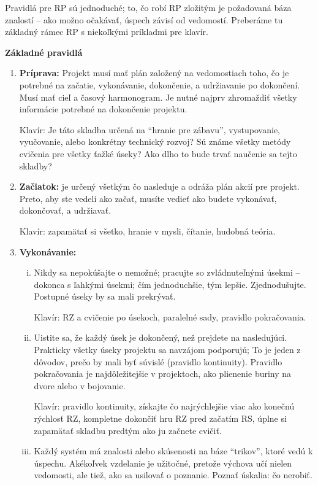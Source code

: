 \documentclass[11pt,a4paper]{book}
\begin{document}
Pravidlá pre RP sú jednoduché; to, čo robí RP zložitým je požadovaná báza znalostí – ako možno očakávať, úspech závisí od vedomostí. Preberáme tu základný rámec RP s niekoľkými príkladmi pre klavír.

\medskip
\noindent\textbf{Základné pravidlá}
\begin{enumerate}[(1)]
\item \textbf{Príprava:} Projekt musí mať plán založený na vedomostiach toho, čo je potrebné na začatie, vykonávanie, dokončenie, a udržiavanie po dokončení. Musí mať cieľ a časový harmonogram. Je nutné najprv zhromaždiť všetky informácie potrebné na dokončenie projektu.

Klavír: Je táto skladba určená na “hranie pre zábavu”, vystupovanie, vyučovanie, alebo konkrétny technický rozvoj? Sú  známe všetky metódy cvičenia pre všetky ťažké úseky? Ako dlho to bude trvať naučenie sa tejto skladby?

\item \textbf{Začiatok:} je určený všetkým čo nasleduje a odráža plán akcií pre projekt. Preto, aby ste vedeli ako začať, musíte vedieť ako budete vykonávať, dokončovať, a udržiavať.

Klavír: zapamätať si všetko, hranie v mysli, čítanie, hudobná teória.

\item \textbf{Vykonávanie:}
\begin{enumerate}[(i)]
\item Nikdy sa nepokúšajte o nemožné; pracujte so zvládnuteľnými úsekmi – dokonca s ľahkými úsekmi; čím jednoduchšie, tým lepšie. Zjednodušujte. Postupné úseky by sa mali prekrývať.

Klavír: RZ a cvičenie po úsekoch, paralelné sady, pravidlo pokračovania.

\item Uistite sa, že každý úsek je dokončený, než prejdete na nasledujúci. Prakticky všetky úseky projektu sa navzájom podporujú; To je jeden z dôvodov, prečo by mali byť súvislé (pravidlo kontinuity). Pravidlo pokračovania je najdôležitejšie v projektoch, ako plienenie buriny na dvore alebo v bojovanie.

Klavír: pravidlo kontinuity, získajte čo najrýchlejšie viac ako konečnú rýchlosť RZ, kompletne dokončiť hru RZ pred začatím RS, úplne si zapamätať skladbu predtým ako ju začnete cvičiť.

\item Každý systém má znalosti alebo skúsenosti na báze “trikov”, ktoré vedú k úspechu. Akékoľvek vzdelanie je užitočné, pretože výchova učí nielen vedomosti, ale tiež, ako sa usilovať o poznanie. Poznať úskalia: čo nerobiť.


\end{enumerate}
\end{enumerate}
\end{document}

